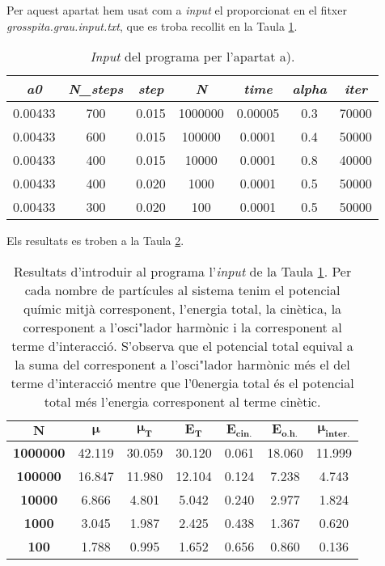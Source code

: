 \documentclass[a4paper]{article}
\begin{document}
Per aquest apartat hem usat com a \textit{input} el proporcionat en el fitxer \textit{grosspita.grau.input.txt}, que es troba recollit en la Taula \ref{tab:input_a}.

\begin{table}[h!]
    \centering
    \begin{tabular}{|c|c|c|c|c|c|c|}
        \hline
        \rowcolor[HTML]{EFEFEF}
        \textbf{\textit{a0}} & \textbf{\textit{N\_steps}} & \textbf{\textit{step}} &\textbf{\textit{N}} & \textbf{\textit{time}} & \textbf{\textit{alpha}} & \textbf{\textit{iter}} \\ \hline\hline
        0.00433 & 700 & 0.015 & 1000000 & 0.00005 & 0.3 & 70000\\ \hline
        0.00433 & 600 & 0.015 & 100000 & 0.0001 & 0.4 & 50000 \\ \hline
        0.00433 & 400 & 0.015 & 10000 & 0.0001 & 0.8 & 40000 \\ \hline
        0.00433 & 400 & 0.020 & 1000 & 0.0001 & 0.5 & 50000 \\ \hline
        0.00433 & 300 & 0.020 & 100 & 0.0001 & 0.5 & 50000 \\ \hline
    \end{tabular}
\caption{\textit{Input} del programa per l'apartat a).}
\label{tab:input_a}
\end{table}

Els resultats es troben a la Taula \ref{tab:res_a}.

\begin{table}[]
    \centering
    \begin{tabular}{|c|c|c|c|c|c|c|}
    \hline
        \rowcolor[HTML]{EFEFEF}
        $\mathbf{N}$ & $\boldsymbol{\mu}$ & $\boldsymbol{\mu_{\textbf{T}}}$ & $\boldsymbol{E_{\textbf{T}}}$ & $\boldsymbol{E_{\textbf{cin.}}}$ & $\boldsymbol{E_{\textbf{o.h.}}}$ & $\boldsymbol{\mu_{\textbf{inter.}}}$ \\ \hline\hline
        \textbf{1000000} & 42.119 & 30.059 & 30.120 & 0.061 & 18.060 & 11.999 \\ \hline
        \textbf{100000} & 16.847 & 11.980 & 12.104 & 0.124 & 7.238 & 4.743 \\ \hline
        \textbf{10000} & 6.866 & 4.801 & 5.042 & 0.240 & 2.977 & 1.824 \\ \hline
        \textbf{1000} & 3.045 & 1.987 & 2.425 & 0.438 & 1.367 & 0.620 \\ \hline
        \textbf{100} & 1.788 & 0.995 & 1.652 & 0.656 & 0.860 & 0.136 \\ \hline
    \end{tabular}
\caption{Resultats d'introduir al programa l'\textit{input} de la Taula \ref{tab:input_a}. Per cada nombre de partícules al sistema tenim el potencial químic mitjà corresponent, l'energia total, la cinètica, la corresponent a l'osci"lador harmònic i la corresponent al terme d'interacció. S'observa que el potencial total equival a la suma del corresponent a l'osci"lador harmònic més el del terme d'interacció mentre que l'0energia total és el potencial total més l'energia corresponent al terme cinètic.}
\label{tab:res_a}
\end{table}
\end{document}
